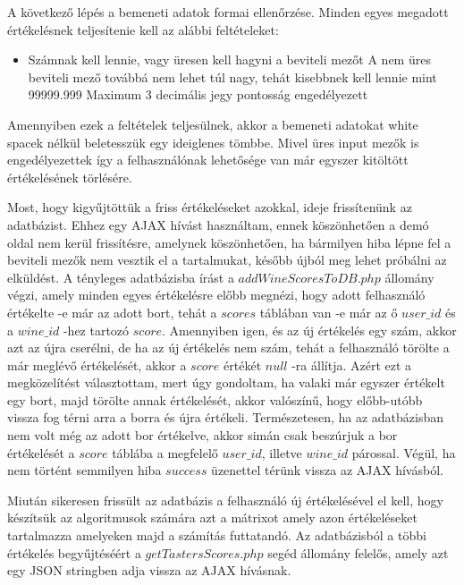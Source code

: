 \documentclass[12pt]{report}
\theoremstyle{definition}
\begin{document}
	A következő lépés a bemeneti adatok formai ellenőrzése. Minden egyes megadott értékelésnek teljesítenie kell az alábbi feltételeket:
	
	\begin{itemize}
		\item Számnak kell lennie, vagy üresen kell hagyni a beviteli mezőt
		\subitem A nem üres beviteli mező továbbá nem lehet túl nagy, tehát kisebbnek kell lennie mint 99999.999
		\subitem Maximum 3 decimális jegy pontosság engedélyezett
	\end{itemize}
	
	Amennyiben ezek a feltételek teljesülnek, akkor a bemeneti adatokat white spacek nélkül beletesszük egy ideiglenes tömbbe. Mivel üres input mezők is engedélyezettek így a felhasználónak lehetősége van már egyszer kitöltött értékelésének törlésére.
	
	Most, hogy kigyűjtöttük a friss értékeléseket azokkal, ideje frissítenünk az adatbázist. Ehhez egy AJAX hívást használtam, ennek köszönhetően a demó oldal nem kerül frissítésre, amelynek köszönhetően, ha bármilyen hiba lépne fel a beviteli mezők nem vesztik el a tartalmukat, később újból meg lehet próbálni az elküldést. A tényleges adatbázisba írást a $addWineScoresToDB.php$ állomány végzi, amely minden egyes értékelésre előbb megnézi, hogy adott felhasználó értékelte -e már az adott bort, tehát a $scores$ táblában van -e már az ő $user\_id$ és a $wine\_id$ -hez tartozó $score$. Amennyiben igen, és az új értékelés egy szám, akkor azt az újra cserélni, de ha az új értékelés nem szám, tehát a felhasználó törölte a már meglévő értékelését, akkor a $score$ értékét $null$ -ra állítja. Azért ezt a megközelítést választottam, mert úgy gondoltam, ha valaki már egyszer értékelt egy bort, majd törölte annak értékelését, akkor valószínű, hogy előbb-utóbb vissza fog térni arra a borra és újra értékeli. Természetesen, ha az adatbázisban nem volt még az adott bor értékelve, akkor simán csak beszúrjuk a bor értékelését a $score$ táblába a megfelelő $user\_id$, illetve $wine\_id$ párossal. Végül, ha nem történt semmilyen hiba $success$ üzenettel térünk vissza az AJAX hívásból.
	
	Miután sikeresen frissült az adatbázis a felhasználó új értékelésével el kell, hogy készítsük az algoritmusok számára azt a mátrixot amely azon értékeléseket tartalmazza amelyeken majd a számítás futtatandó. Az adatbázisból a többi értékelés begyűjtéséért a \linebreak$getTastersScores.php$ segéd állomány felelős, amely azt egy JSON stringben adja vissza az AJAX hívásnak.
	
\end{document}
